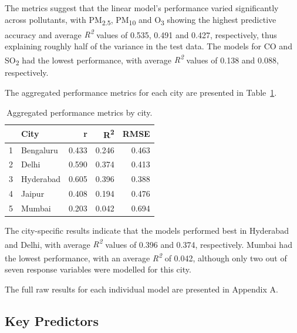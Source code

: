 \documentclass[twoside,11pt]{article}
\begin{document}
The metrics suggest that the linear model's performance varied significantly across pollutants, with PM\textsubscript{2.5}, PM\textsubscript{10} and O\textsubscript{3} showing the highest predictive accuracy and average \textit{R\textsuperscript{2}} values of 0.535, 0.491 and 0.427, respectively, thus explaining roughly half of the variance in the test data. The models for CO and SO\textsubscript{2} had the lowest performance, with average \textit{R\textsuperscript{2}} values of 0.138 and 0.088, respectively.

The aggregated performance metrics for each city are presented in Table~\ref{tab:performance_metrics_by_city}.

\begin{table}[ht]
\centering
\begin{tabular}{rlrrr}
  \hline
  & City & r & R\textsuperscript{2} & RMSE \\
  \hline
1 & Bengaluru & 0.433 & 0.246 & 0.463 \\ 
  2 & Delhi & 0.590 & 0.374 & 0.413 \\ 
  3 & Hyderabad & 0.605 & 0.396 & 0.388 \\ 
  4 & Jaipur & 0.408 & 0.194 & 0.476 \\ 
  5 & Mumbai & 0.203 & 0.042 & 0.694 \\ 
    \hline
\end{tabular}
\caption{Aggregated performance metrics by city.}
\label{tab:performance_metrics_by_city}
\end{table}

The city-specific results indicate that the models performed best in Hyderabad and Delhi, with average \textit{R\textsuperscript{2}} values of 0.396 and 0.374, respectively. Mumbai had the lowest performance, with an average \textit{R\textsuperscript{2}} of 0.042, although only two out of seven response variables were modelled for this city.

The full raw results for each individual model are presented in Appendix A.

\subsection{Key Predictors}


\end{document}
